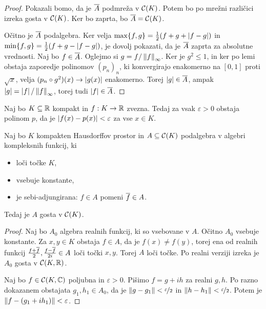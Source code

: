 \begin{proof}
  Pokazali bomo, da je $\overline{A}$ podmreža v $\mathcal{C}(K)$.
  Potem bo po mrežni različici izreka gosta v $\mathcal{C}(K)$.
  Ker bo zaprta, bo $\overline{A} = \mathcal{C}(K)$.

  Očitno je $\overline{A}$ podalgebra.
  Ker velja $\max\{f,g\} = \frac{1}{2} (f + g + \left| f-g \right|)$ in $\min\{f,g\} = \frac{1}{2}(f+g
  - \left| f-g \right|)$, je dovolj pokazati, da je $\overline{A}$ zaprta za absolutne
  vrednosti.
  Naj bo $f \in \overline{A}$.
  Oglejmo si $g = f / \left\lVert f\right\rVert_\infty$.
  Ker je $g^2 \le 1$, in ker po lemi obstaja zaporedje polinomov $(p_n)_n$, ki
  konvergirajo enakomerno na $[0,1]$ proti $\sqrt{x}$, velja $(p_n \circ g^2)(x)
  \to \left| g(x) \right|$ enakomerno.
  Torej $\left| g \right| \in \overline{A}$, ampak $\left| g \right| = \left| f \right| / \left\lVert f\right\rVert_\infty$, torej
  tudi $\left| f \right| \in \overline{A}$.
\end{proof}

\begin{izrek}[Weierstrass]
  Naj bo $K \subseteq \mathbb{R}$ kompakt in $f: K \to \mathbb{R}$ zvezna.
  Tedaj za vsak $\varepsilon > 0$ obstaja polinom $p$, da je $\left| f(x) - p(x) \right|
  < \varepsilon$ za vse $x \in K$.
\end{izrek}

\begin{izrek}
  Naj bo $K$ kompakten Hausdorffov prostor in $A \subseteq \mathcal{C}(K)$
  podalgebra v algebri kompleksnih funkcij, ki
  \begin{itemize}
  \item loči točke $K$,
  \item vsebuje konstante,
  \item je sebi-adjungirana: $f \in A$ pomeni $\overline{f} \in A$.
  \end{itemize}
  Tedaj je $A$ gosta v $\mathcal{C}(K)$.
\end{izrek}

\begin{proof}
  Naj bo $A_0$ algebra realnih funkcij, ki so vsebovane v $A$.
  Očitno $A_0$ vsebuje konstante.
  Za $x, y \in K$ obstaja $f \in A$, da je $f(x) \ne f(y)$, torej ena od realnih
  funkcij $\frac{f+\overline{f}}{2}, \frac{f-\overline{f}}{2i} \in A$ loči točki $x, y$.
  Torej $A$ loči točke.
  Po realni verziji izreka je $A_0$ gosta v $\mathcal{C}(K, \mathbb{R})$.

  Naj bo $f \in \mathcal{C}(K, \mathbb{C})$ poljubna in $\varepsilon >0$.
  Pišimo $f = g + ih$ za realni $g, h$.
  Po razno dokazanem obstajata $g_1, h_1 \in A_0$, da je $\left\lVert g - g_1\right\rVert <
  \nicefrac{\varepsilon}{2}$ in $\left\lVert h-h_1\right\rVert < \nicefrac{\varepsilon}{2}$.
  Potem je $\left\lVert f - (g_1 + i h_1)\right\rVert < \varepsilon$.
\end{proof}

